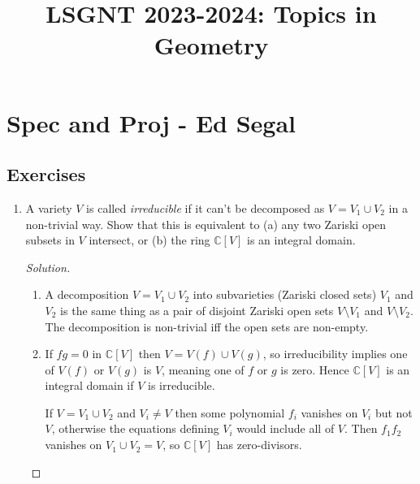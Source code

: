 \documentclass{article}
\title{LSGNT 2023-2024: Topics in Geometry}
\author{}
\date{}
\theoremstyle{definition}
\newcommand{\C}{\mathbb{C}}
\begin{document}
\maketitle

\tableofcontents

\newpage

\section{Spec and Proj - Ed Segal}

\subsection*{Exercises}

\begin{enumerate}
    \item A variety $V$ is called \emph{irreducible} if it can't be decomposed
        as $V=V_1\cup V_2$ in a non-trivial way. Show that this is equivalent to
        (a) any two Zariski open subsets in $V$ intersect, or (b) the ring
        $\C[V]$ is an integral domain.

        \begin{proof}[Solution]
            \begin{enumerate}[label=(\alph*)]
                \item A decomposition $V=V_1\cup V_2$ into subvarieties (Zariski
                    closed sets) $V_1$ and $V_2$ is the same thing as a pair of
                    disjoint Zariski open sets $V\setminus V_1$ and
                    $V\setminus V_2$. The decomposition is non-trivial iff the
                    open sets are non-empty.

                \item If $fg=0$ in $\C[V]$ then $V=V(f)\cup V(g)$, so
                    irreducibility implies one of $V(f)$ or $V(g)$ is $V$,
                    meaning one of $f$ or $g$ is zero. Hence $\C[V]$ is an
                    integral domain if $V$ is irreducible.

                    If $V=V_1\cup V_2$ and $V_i\ne V$ then some polynomial $f_i$
                    vanishes on $V_i$ but not $V$, otherwise the equations
                    defining $V_i$ would include all of $V$. Then $f_1f_2$
                    vanishes on $V_1\cup V_2=V$, so $\C[V]$ has zero-divisors.
            \end{enumerate}
        \end{proof}


\end{enumerate}
\end{document}
